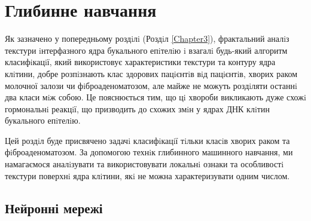 
\chapter{Глибинне навчання} %

\label{Chapter4} %

Як зазначено у попередньому роздiлi (Роздiл \ref{Chapter3}), фрактальний аналiз текстури iнтерфазного ядра букального епiтелiю i взагалi будь-який алгоритм класифiкацiї, який використовує характеристики текстури та контуру ядра клiтини, добре розпiзнають клас здорових пацiєнтiв вiд пацiєнтiв, хворих раком молочної залози чи фiброаденоматозом, але майже не можуть роздiляти останнi два класи мiж собою. Це пояснюється тим, що цi хвороби викликають дуже схожi гормональнi реакцiї, що призводить до схожих змiн у ядрах ДНК клiтин букального епiтелiю.

Цей роздiл буде присвячено задачi класифiкацiї тiльки класiв хворих раком та фiброаденоматозом. За допомогою технiк глибинного машинного навчання, ми намагаємося аналiзувати та використовувати локальнi ознаки та особливостi текстури поверхнi ядра клiтини, якi не можна характеризувати одним числом. 


\section{Нейронні мережі}

